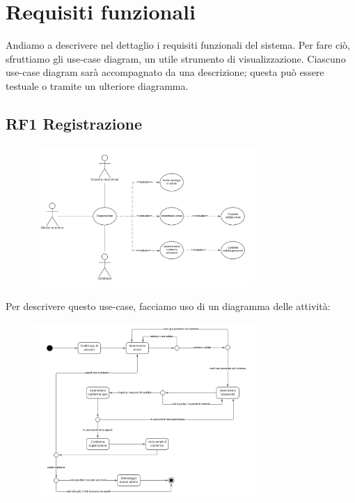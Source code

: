 \documentclass[a4paper,12pt]{article}
\begin{document}
\newpage
\section{Requisiti funzionali}

Andiamo a descrivere nel dettaglio i requisiti funzionali del sistema. Per fare ciò, sfruttiamo gli use-case diagram, un utile strumento di visualizzazione. Ciascuno use-case diagram sarà accompagnato da una descrizione; questa può essere testuale o tramite un ulteriore diagramma.

\subsection*{RF1 Registrazione}

\begin{figure}[htp]
    \centering
    \includegraphics[width=0.75\textwidth]{diagrams/use-case-1.png}
\end{figure}

Per descrivere questo use-case, facciamo uso di un diagramma delle attività:

\begin{figure}[htp]
    \centering
    \includegraphics[width=0.75\textwidth]{diagrams/activity-1.png}
\end{figure}
\end{document}
